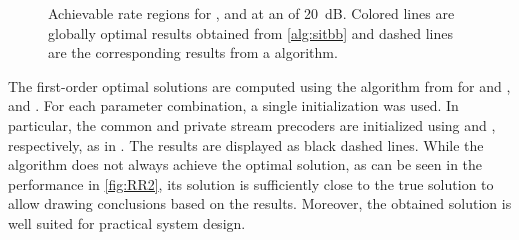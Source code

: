 \documentclass[a4paper,10pt,journal]{IEEEtran}
\begin{document}
\begin{figure}%
	\hfill%
	\caption{Achievable rate regions for ,  and  at an  of \SI{20}{\dB}. Colored lines are globally optimal results obtained from \cref{alg:sitbb} and dashed lines are the corresponding results from a  algorithm.}
	\label{fig:RR}
\end{figure}

The first-order optimal solutions are computed using the  algorithm from \cite{mao2017eurasip} for  and , and . For each parameter combination, a single initialization was used. In particular, the common and private stream precoders are initialized using  and , respectively, as in \cite{mao2021IoT}.
The results are displayed as black dashed lines. While the  algorithm does not always achieve the optimal solution, as can be seen in the  performance in \cref{fig:RR2}, its solution is sufficiently close to the true solution to allow drawing conclusions based on the results. Moreover, the obtained solution is well suited for practical system design.
\end{document}
